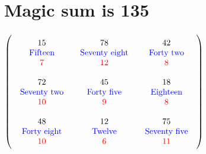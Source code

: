 \documentclass{article}
\begin{document}
\vspace{2em} 
\section{Magic sum is 135}$ \left( \begin{array}{ccc}
\begin{array}{c}
\rule{0pt}{1.5em}15 \\ 
\text{\color{blue}Fifteen} \\ 
\color{red}7 \vspace{.5em} 
\end{array} & \begin{array}{c}
\rule{0pt}{1.5em}78 \\ 
\text{\color{blue}Seventy eight} \\ 
\color{red}12 \vspace{.5em} 
\end{array} & \begin{array}{c}
\rule{0pt}{1.5em}42 \\ 
\text{\color{blue}Forty two} \\ 
\color{red}8 \vspace{.5em} 
\end{array}\\ 
\begin{array}{c}
\rule{0pt}{1.5em}72 \\ 
\text{\color{blue}Seventy two} \\ 
\color{red}10 \vspace{.5em} 
\end{array} & \begin{array}{c}
\rule{0pt}{1.5em}45 \\ 
\text{\color{blue}Forty five} \\ 
\color{red}9 \vspace{.5em} 
\end{array} & \begin{array}{c}
\rule{0pt}{1.5em}18 \\ 
\text{\color{blue}Eighteen} \\ 
\color{red}8 \vspace{.5em} 
\end{array}\\ 
\begin{array}{c}
\rule{0pt}{1.5em}48 \\ 
\text{\color{blue}Forty eight} \\ 
\color{red}10 \vspace{.5em} 
\end{array} & \begin{array}{c}
\rule{0pt}{1.5em}12 \\ 
\text{\color{blue}Twelve} \\ 
\color{red}6 \vspace{.5em} 
\end{array} & \begin{array}{c}
\rule{0pt}{1.5em}75 \\ 
\text{\color{blue}Seventy five} \\ 
\color{red}11 \vspace{.5em} 
\end{array}\end{array} \right) $
\end{document}
